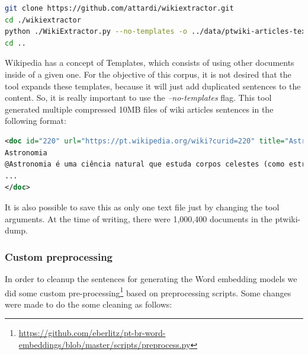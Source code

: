 \begin{lstlisting}[language=sh]
git clone https://github.com/attardi/wikiextractor.git
cd ./wikiextractor
python ./WikiExtractor.py --no-templates -o ../data/ptwiki-articles-text/ -b 10M -c ../data/ptwiki-latest-pages-articles-multistream.xml.bz2
cd ..
\end{lstlisting}

Wikipedia has a concept of Templates, which consists of using other documents inside of a given one. For the objective of this corpus, it is not desired that the tool expands these templates, because it will just add duplicated sentences to the content. So, it is really important to use the \textit{–no-templates} flag.
This tool generated multiple compressed 10MB files of wiki articles sentences in the following format:

\begin{lstlisting}[language=XML]
<doc id="220" url="https://pt.wikipedia.org/wiki?curid=220" title="Astronomia">
Astronomia 
@Astronomia é uma ciência natural que estuda corpos celestes (como estrelas, planetas, cometas, nebulosas, aglomerados de estrelas, galáxias) e fenômenos que se originam fora da atmosfera da Terra (como a radiação cósmica de fundo em micro-ondas). Preocupada com a evolução, a física, a química e o movimento de objetos celestes, bem como a formação e o desenvolvimento do universo.@
...
</doc>
\end{lstlisting}

It is also possible to save this as only one text file just by changing the tool arguments.
At the time of writing, there were 1,000,400 documents in the ptwiki-dump.

\subsubsection{Custom preprocessing}

In order to cleanup the sentences for generating the Word embedding models we did some custom pre-processing\footnote{\url{https://github.com/eberlitz/pt-br-word-embeddings/blob/master/scripts/preprocess.py}} based on  preprocessing scripts. Some changes were made to do the some cleaning as follows:

